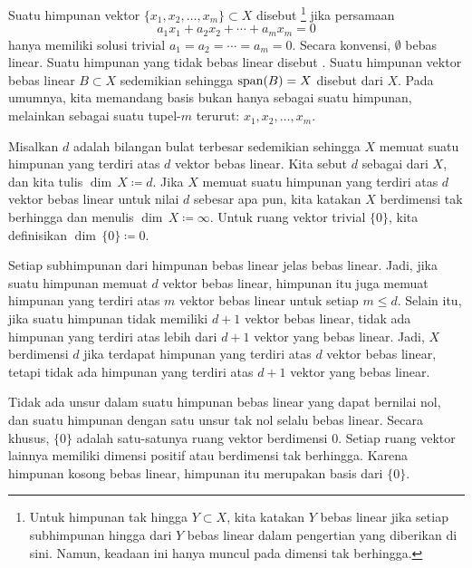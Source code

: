\begin{defn}
Suatu himpunan vektor $\{ x_1, x_2, \ldots, x_m \} \subset X$ disebut 
\emph{}\footnote{%
Untuk himpunan tak hingga $Y \subset X$, kita katakan $Y$ bebas
linear jika setiap subhimpunan hingga dari $Y$ bebas linear
dalam pengertian yang diberikan di sini.
Namun, keadaan ini hanya muncul pada dimensi tak berhingga.}
jika persamaan
\begin{equation} \label{eq:lincomb}
a_1 x_1 + a_2 x_2 + \cdots + a_m x_m = 0
\end{equation}
hanya memiliki solusi trivial $a_1 = a_2 = \cdots = a_m = 0$.
Secara konvensi, $\emptyset$ bebas linear.
Suatu himpunan yang tidak bebas linear disebut
\emph{}.
%
Suatu himpunan vektor bebas linear $B \subset X$ sedemikian sehingga
$\operatorname{span}(B) = X$ 
disebut \emph{} dari $X$.
Pada umumnya, kita memandang basis bukan hanya sebagai suatu himpunan, melainkan sebagai
suatu tupel-$m$ terurut:
$x_1,x_2,\ldots,x_m$.

Misalkan $d$ adalah bilangan bulat terbesar sedemikian sehingga $X$ memuat suatu himpunan
yang terdiri atas $d$ vektor bebas linear.  Kita sebut $d$ sebagai
\emph{} dari $X$,
dan kita tulis $\dim \, X \coloneqq d$.
Jika $X$ memuat suatu himpunan yang terdiri atas $d$ vektor bebas linear 
untuk nilai $d$ sebesar apa pun, kita katakan
$X$ berdimensi tak berhingga dan menulis $\dim \, X \coloneqq \infty$.
%
Untuk ruang vektor trivial $\{ 0 \}$, kita definisikan $\dim \, \{ 0 \} \coloneqq 0$.
\end{defn}

Setiap subhimpunan dari himpunan bebas linear jelas bebas linear.
Jadi, jika suatu himpunan memuat $d$ vektor bebas linear, himpunan itu juga memuat
himpunan yang terdiri atas $m$ vektor bebas linear untuk setiap $m \leq d$.
Selain itu, jika suatu himpunan tidak memiliki $d+1$
vektor bebas linear, tidak ada himpunan yang terdiri atas lebih dari $d+1$ vektor yang bebas
linear.
Jadi, $X$ berdimensi $d$ jika terdapat
himpunan yang terdiri atas $d$ vektor bebas linear, tetapi tidak ada
himpunan yang terdiri atas $d+1$ vektor yang bebas linear.

Tidak ada unsur dalam suatu himpunan bebas linear yang dapat bernilai nol,
dan suatu himpunan dengan satu unsur tak nol selalu bebas linear.
Secara khusus, $\{ 0 \}$ adalah satu-satunya ruang vektor berdimensi $0$.
Setiap ruang vektor lainnya memiliki dimensi positif
atau berdimensi tak berhingga.
Karena himpunan kosong bebas linear, himpunan itu merupakan basis
dari $\{ 0 \}$.


